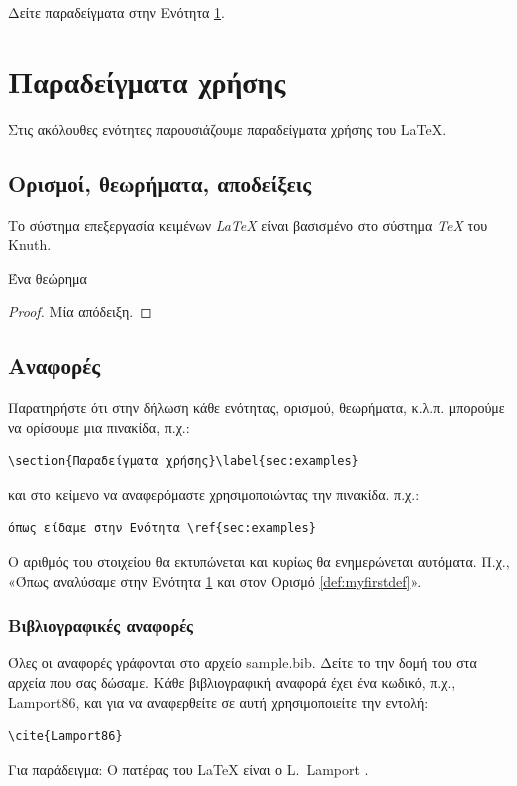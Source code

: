 Δείτε παραδείγματα στην Ενότητα \ref{sec:examples}.

%
%
\section{Παραδείγματα χρήσης}\label{sec:examples}

Στις ακόλουθες ενότητες παρουσιάζουμε παραδείγματα χρήσης του \LaTeX.

%
%
\subsection{Ορισμοί, θεωρήματα, αποδείξεις}\label{sec:definitions}

\begin{definition}\label{def:myfirstdef}
Το σύστημα επεξεργασία κειμένων \emph{\LaTeX} \cite{Lamport86} είναι βασισμένο στο σύστημα \emph{\TeX} του Knuth.
\end{definition}

\begin{theorem}\label{the:myfirsttheorem}
Ένα θεώρημα
\end{theorem}

\begin{proof}\label{the:myfirstproof}
Μία απόδειξη. 
\end{proof}

%
%
\subsection{Αναφορές}\label{sec:references}
Παρατηρήστε ότι στην δήλωση κάθε ενότητας, ορισμού, θεωρήματα, κ.λ.π. μπορούμε να ορίσουμε μια πινακίδα, π.χ.:
\begin{verbatim}
\section{Παραδείγματα χρήσης}\label{sec:examples}
\end{verbatim}
και στο κείμενο να αναφερόμαστε χρησιμοποιώντας την πινακίδα. π.χ.:
\begin{verbatim}
όπως είδαμε στην Ενότητα \ref{sec:examples}
\end{verbatim}

Ο αριθμός του στοιχείου θα εκτυπώνεται και κυρίως θα ενημερώνεται αυτόματα. Π.χ., «Όπως αναλύσαμε στην Ενότητα \ref{sec:examples} και στον Ορισμό \ref{def:myfirstdef}». 
 

%
%
\subsubsection{Βιβλιογραφικές αναφορές}\label{sec:cite}
Όλες οι αναφορές γράφονται στο αρχείο sample.bib. Δείτε το την δομή του στα αρχεία που σας δώσαμε. Κάθε βιβλιογραφική αναφορά έχει ένα κωδικό, π.χ., Lamport86, και για να αναφερθείτε σε αυτή χρησιμοποιείτε την εντολή:
\begin{verbatim}
\cite{Lamport86}
\end{verbatim}
Για παράδειγμα: Ο πατέρας του {\LaTeX} είναι ο L.\ Lamport \cite{Lamport86}.

